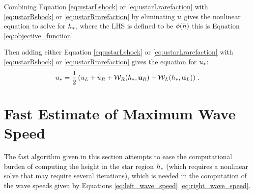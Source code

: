Combining Equation \eqref{eq:ustarLshock} or \eqref{eq:ustarLrarefaction}
with \eqref{eq:ustarRshock} or \eqref{eq:ustarRrarefaction} by eliminating
$u$ gives the nonlinear
equation to solve for $h_*$, where the LHS is defined to be $\phi(h)$
this is Equation \eqref{eq:objective_function}.

Then adding either Equation \eqref{eq:ustarLshock} or \eqref{eq:ustarLrarefaction}
with \eqref{eq:ustarRshock} or \eqref{eq:ustarRrarefaction} gives the equation
for $u_*$:
\begin{equation}
  u_* = \frac{1}{2}\left(u_L + u_R
    + \mathcal{W}_R(h_*,\mathbf{u}_R)
    - \mathcal{W}_L(h_*,\mathbf{u}_L)\right)
    \,.
\end{equation}

\section{Fast Estimate of Maximum Wave Speed}

The fast algorithm given in this section attempts to ease the computational
burden of computing the height in the star region $h_*$ (which requires
a nonlinear solve that may require several iterations), which is needed
in the computation of the wave speeds given by Equations \eqref{eq:left_wave_speed}
\eqref{eq:right_wave_speed}.

